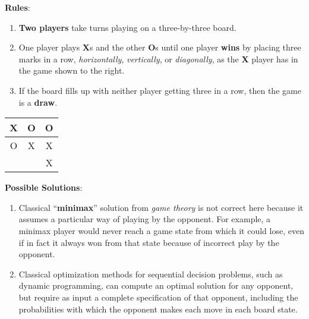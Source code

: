 \begin{table}[H]
    \begin{minipage}{0.79\linewidth}
        \textbf{Rules}:
        \begin{enumerate}
            \item \textbf{Two players} take turns playing on a three-by-three board. 
            
            \item One player plays \textbf{X}s and the other \textbf{O}s until one player \textbf{wins} by placing three marks in a row, \textit{horizontally}, \textit{vertically}, or \textit{diagonally}, as the \textbf{X} player has in the game shown to the right. 
            
            \item If the board fills up with neither player getting three in a row, then the game is a \textbf{draw}.
        \end{enumerate}
    \end{minipage}
    \hfill
    \begin{minipage}{0.19\linewidth}
        \begin{table}[H]
            \centering
            \begin{tabular}{c|c|c}
                 X & O & O \\
                 \hline
                 O & X & X \\
                 \hline
                 && X\\
            \end{tabular}
        \end{table}
    \end{minipage}
\end{table}

\noindent
\textbf{Possible Solutions}:
\begin{enumerate}
    \item Classical “\textbf{minimax}” solution from \textit{game theory} is not correct here because it assumes a particular way of playing by the opponent. For example, a minimax player would never reach a game state from which it could lose, even if in fact it always won from that state because of incorrect play by the opponent.

    \item Classical optimization methods for sequential decision problems, such as dynamic programming, can compute an optimal solution for any opponent, but require as input a complete specification of that opponent, including the probabilities with which the opponent makes each move in each board state.
\end{enumerate}


